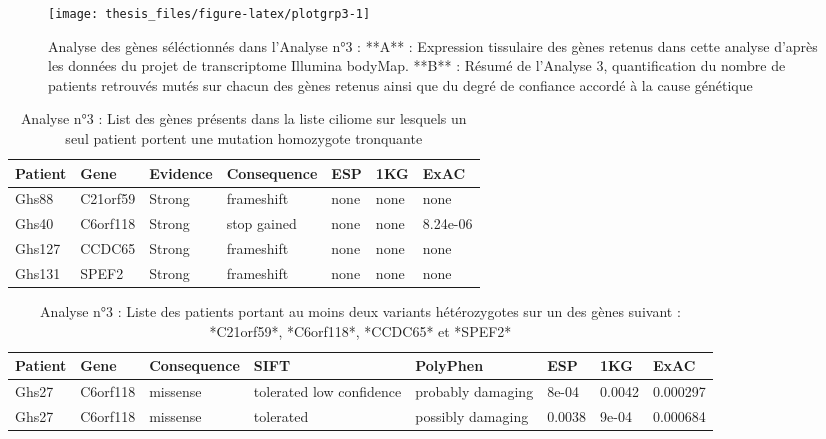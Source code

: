 \documentclass[12pt,twoside]{reedthesis}
\theoremstyle{definition}
\theoremstyle{definition}
\theoremstyle{remark}
\begin{document}
  \begin{figure}
  
  {\centering \texttt{[image: thesis\_files/figure-latex/plotgrp3-1]} 
  
  }
  
  \caption[Analyse des gènes séléctionnés dans l'Analyse n°3]{Analyse des gènes séléctionnés dans l'Analyse n°3 : **A** : Expression tissulaire des gènes retenus dans cette analyse d'après les données du projet de transcriptome Illumina bodyMap. **B** : Résumé de l'Analyse 3, quantification du nombre de patients retrouvés mutés sur chacun des gènes retenus ainsi que du degré de confiance accordé à la cause génétique}\label{fig:plotgrp3}
  \end{figure}
  
  \newpage
  
  \begin{longtable}[t]{lllllll}
  \caption{\label{tab:tabgrp3high}Analyse n°3 : List des gènes présents dans la liste ciliome sur lesquels un seul patient portent une mutation homozygote tronquante}\\
  \toprule
  Patient & Gene & Evidence & Consequence & ESP & 1KG & ExAC\\
  \midrule
  Ghs88 & C21orf59 & Strong & frameshift & none & none & none\\
  Ghs40 & C6orf118 & Strong & stop gained & none & none & 8.24e-06\\
  Ghs127 & CCDC65 & Strong & frameshift & none & none & none\\
  Ghs131 & SPEF2 & Strong & frameshift & none & none & none\\
  \bottomrule
  \end{longtable}
  
  \begin{longtable}[t]{llllllll}
  \caption{\label{tab:tabgrp3low}Analyse n°3 : Liste des patients portant au moins deux variants hétérozygotes sur un des gènes suivant : *C21orf59*, *C6orf118*, *CCDC65*  et  *SPEF2*}\\
  \toprule
  Patient & Gene & Consequence & SIFT & PolyPhen & ESP & 1KG & ExAC\\
  \midrule
  Ghs27 & C6orf118 & missense & tolerated low confidence & probably damaging & 8e-04 & 0.0042 & 0.000297\\
  Ghs27 & C6orf118 & missense & tolerated & possibly damaging & 0.0038 & 9e-04 & 0.000684\\
  \bottomrule
  \end{longtable}
  
\end{document}
